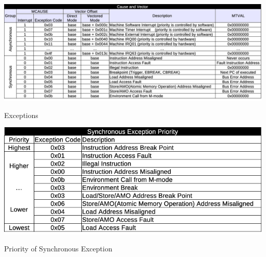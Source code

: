 \begin{table}[H]
    \includegraphics[width=1.00\columnwidth]{./Table/Exception_List.png}
    \caption{Exceptions}
    \label{tb:EXCEPTION_LIST}
\end{table}

\begin{table}[H]
    \includegraphics[width=1.00\columnwidth]{./Table/Exception_Priority.png}
    \caption{Priority of Synchronous Exception}
    \label{tb:EXCEPTION_PRIORITY}
\end{table}





